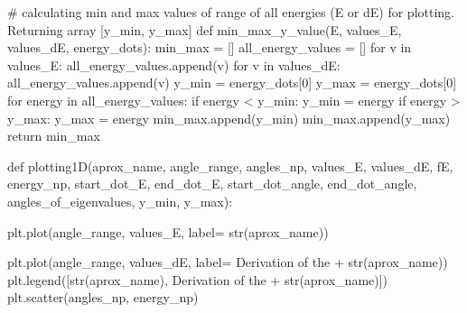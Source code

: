 \documentclass[
  letterpaper,
  DIV=11,
  numbers=noendperiod]{scrartcl}
\newenvironment{Shaded}{\begin{snugshade}}{\end{snugshade}}
\newcommand{\BuiltInTok}[1]{\textcolor[rgb]{0.00,0.23,0.31}{#1}}
\newcommand{\CommentTok}[1]{\textcolor[rgb]{0.37,0.37,0.37}{#1}}
\newcommand{\ControlFlowTok}[1]{\textcolor[rgb]{0.00,0.23,0.31}{#1}}
\newcommand{\DecValTok}[1]{\textcolor[rgb]{0.68,0.00,0.00}{#1}}
\newcommand{\KeywordTok}[1]{\textcolor[rgb]{0.00,0.23,0.31}{#1}}
\newcommand{\NormalTok}[1]{\textcolor[rgb]{0.00,0.23,0.31}{#1}}
\newcommand{\OperatorTok}[1]{\textcolor[rgb]{0.37,0.37,0.37}{#1}}
\newcommand{\StringTok}[1]{\textcolor[rgb]{0.13,0.47,0.30}{#1}}
\begin{document}
\begin{Shaded}
\begin{Highlighting}[]
    \CommentTok{\# calculating min and max values of range of all energies (E or dE) for plotting. Returning array [y\_min, y\_max]}
    \KeywordTok{def}\NormalTok{ min\_max\_y\_value(E, values\_E, values\_dE, energy\_dots):}
\NormalTok{        min\_max }\OperatorTok{=}\NormalTok{ []}
\NormalTok{        all\_energy\_values }\OperatorTok{=}\NormalTok{ []}
        \ControlFlowTok{for}\NormalTok{ v }\KeywordTok{in}\NormalTok{ values\_E:}
\NormalTok{            all\_energy\_values.append(v)}
        \ControlFlowTok{for}\NormalTok{ v }\KeywordTok{in}\NormalTok{ values\_dE:}
\NormalTok{            all\_energy\_values.append(v)}
\NormalTok{        y\_min }\OperatorTok{=}\NormalTok{ energy\_dots[}\DecValTok{0}\NormalTok{]}
\NormalTok{        y\_max }\OperatorTok{=}\NormalTok{ energy\_dots[}\DecValTok{0}\NormalTok{]}
        \ControlFlowTok{for}\NormalTok{ energy }\KeywordTok{in}\NormalTok{ all\_energy\_values:}
            \ControlFlowTok{if}\NormalTok{ energy }\OperatorTok{\textless{}}\NormalTok{ y\_min:}
\NormalTok{                y\_min }\OperatorTok{=}\NormalTok{ energy}
            \ControlFlowTok{if}\NormalTok{ energy }\OperatorTok{\textgreater{}}\NormalTok{ y\_max:}
\NormalTok{                y\_max }\OperatorTok{=}\NormalTok{ energy}
\NormalTok{        min\_max.append(y\_min)}
\NormalTok{        min\_max.append(y\_max)}
        \ControlFlowTok{return}\NormalTok{ min\_max}
    
    \KeywordTok{def}\NormalTok{ plotting1D(aprox\_name, angle\_range, angles\_np, values\_E, values\_dE, fE, energy\_np, start\_dot\_E, end\_dot\_E, start\_dot\_angle, end\_dot\_angle, angles\_of\_eigenvalues, y\_min, y\_max):}
        
\NormalTok{        plt.plot(angle\_range, values\_E, label}\OperatorTok{=} \BuiltInTok{str}\NormalTok{(aprox\_name))}
        
\NormalTok{        plt.plot(angle\_range, values\_dE, label}\OperatorTok{=} \StringTok{\textquotesingle{}Derivation of the \textquotesingle{}} \OperatorTok{+} \BuiltInTok{str}\NormalTok{(aprox\_name))}
\NormalTok{        plt.legend([}\BuiltInTok{str}\NormalTok{(aprox\_name), }\StringTok{\textquotesingle{}Derivation of the \textquotesingle{}} \OperatorTok{+} \BuiltInTok{str}\NormalTok{(aprox\_name)])}
\NormalTok{        plt.scatter(angles\_np, energy\_np)}
        

\end{Highlighting}
\end{Shaded}
\end{document}
